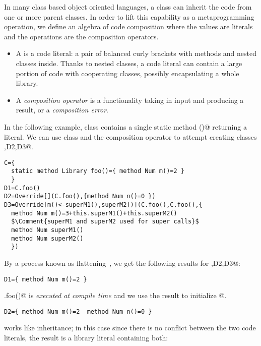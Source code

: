 In many class based object oriented languages, a class can inherit the code
from one or more parent classes.
In order to lift this capability as a metaprogramming operation,
we define an algebra of code composition where the values
are \Q@Library@ literals and the operations are the composition operators.

\begin{itemize}
\item A \Q@Library@ is a code literal:
a pair of balanced curly brackets with methods and nested classes inside.
Thanks to nested classes, a code literal can contain a large portion of code
with cooperating classes, possibly encapsulating a whole library.
\item A \emph{composition operator}
is a functionality taking in input \Q@Library@s and producing a \Q@Library@
result, or a \emph{composition error}.
\end{itemize}

\noindent
In the following example, class \Q@C@ contains a single static 
method \Q@foo()@ returning a \Q@Library@ literal.
We can use class \Q@C@ and the \Q@Override@ composition operator to
attempt creating classes ,D2,D3@.

\saveSpace
\begin{lstlisting}
C={
  static method Library foo()={ method Num m()=2 }  
  }
D1=C.foo()
D2=Override[](C.foo(),{method Num n()=0 })
D3=Override[m()<-superM1(),superM2()](C.foo(),C.foo(),{
  method Num m()=3+this.superM1()+this.superM2()
  $\Comment{superM1 and superM2 used for super calls}$
  method Num superM1()
  method Num superM2()
  })
\end{lstlisting}
\saveSpace

\noindent
By a process known as flattening~\cite{scharli2003traits}, we get the following results for ,D2,D3@:

\saveSpace
\begin{lstlisting}
D1={ method Num m()=2 }  
\end{lstlisting}
\saveSpace

\noindent
\Q@C.foo()@ is \emph{executed at compile time}
and we use the result to initialize @.

\saveSpace
\begin{lstlisting}
D2={ method Num m()=2  method Num n()=0 }  
\end{lstlisting}
\saveSpace

\noindent
\Q@Override@ works like inheritance; in this case since there is no conflict between
the two code literals, the result is a library literal containing both:

